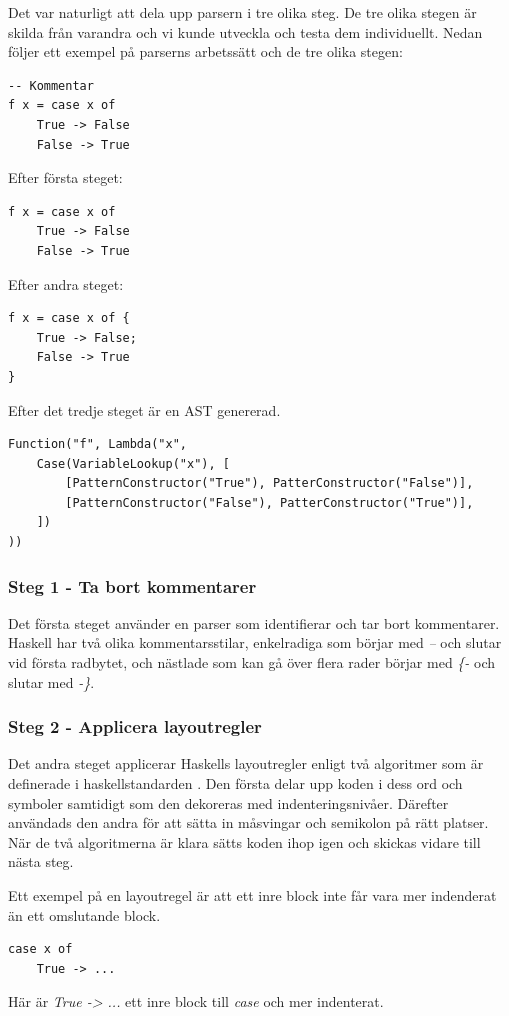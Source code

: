 Det var naturligt att dela upp parsern i tre olika steg. De tre olika stegen är skilda från varandra och vi kunde utveckla och testa dem individuellt.
Nedan följer ett exempel på parserns arbetssätt och de tre olika stegen:
\begin{lstlisting}
-- Kommentar
f x = case x of
    True -> False
    False -> True
\end{lstlisting}

Efter första steget:
\begin{lstlisting}
f x = case x of
    True -> False
    False -> True
\end{lstlisting}

Efter andra steget:
\begin{lstlisting}
f x = case x of {
    True -> False;
    False -> True
}
\end{lstlisting}

Efter det tredje steget är en AST genererad.
\begin{lstlisting}
Function("f", Lambda("x", 
    Case(VariableLookup("x"), [
        [PatternConstructor("True"), PatterConstructor("False")],
        [PatternConstructor("False"), PatterConstructor("True")],
    ])
))
\end{lstlisting}

\subsubsection{Steg 1 - Ta bort kommentarer}
Det första steget använder en parser som identifierar och tar bort kommentarer. 
Haskell har två olika kommentarsstilar, enkelradiga som börjar med \emph{--} och slutar vid första radbytet, och 
nästlade som kan gå över flera rader börjar med \emph{\{-} och slutar med \emph{-\}}.

\subsubsection{Steg 2 - Applicera layoutregler}
Det andra steget applicerar Haskells layoutregler enligt två algoritmer som är definerade i haskellstandarden \citep{haskell98chap9}. Den första delar upp koden i dess ord och symboler samtidigt som den dekoreras med indenteringsnivåer. 
Därefter användads den andra för att sätta in måsvingar och semikolon på rätt platser.
När de två algoritmerna är klara sätts koden ihop igen och skickas vidare till nästa steg.

Ett exempel på en layoutregel är att ett inre block inte får vara mer indenderat än ett omslutande block.
\begin{lstlisting}
case x of
    True -> ...
\end{lstlisting}
Här är \emph{True -> ...} ett inre block till \emph{case} och mer indenterat.

